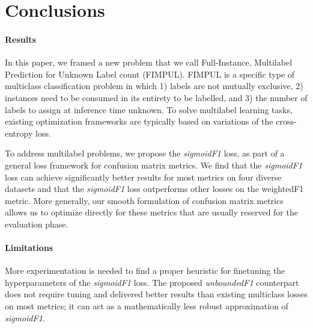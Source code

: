 
\section{Conclusions}
\label{sec:orged3d8a1}


\paragraph{Results}
In this paper, we framed a new problem that we call Full-Instance, Multilabel Prediction for Unknown Label count (FIMPUL). FIMPUL is a specific type of multiclass classification problem in which 1) labels are not mutually exclusive, 2) instances need to be consumed in its entirety to be labelled,
and 3) the number of labels to assign at inference time unknown.
To solve multilabel learning tasks, existing optimization frameworks are typically based on variations of the cross-entropy loss.

To address multilabel problems, we propose the \emph{sigmoidF1} loss, as part of a general loss framework for confusion matrix metrics. We find that the \emph{sigmoidF1} loss can achieve significantly better results for most metrics on four diverse datasets and that the \emph{sigmoidF1} loss outperforms other losses on the weightedF1 metric.
More generally, our smooth formulation of confusion matrix metrics allows us to optimize directly for these metrics that are usually reserved for the evaluation phase.

\paragraph{Limitations}
More experimentation is needed to find a proper heuristic for finetuning the hyperparameters of the \emph{sigmoidF1} loss. The proposed \emph{unboundedF1} counterpart does not require tuning and delivered better results than existing multiclass losses on most metrics; it can act as a mathematically less robust approximation of \emph{sigmoidF1}.

